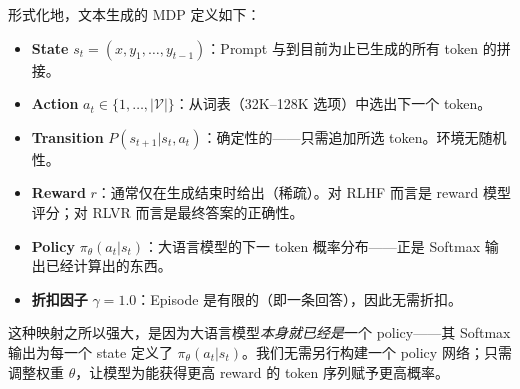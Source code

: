 形式化地，文本生成的 MDP 定义如下：

\begin{itemize}
  \item \textbf{State} $s_t = (x, y_1, \ldots, y_{t-1})$：Prompt 与到目前为止已生成的所有 token 的拼接。
  \item \textbf{Action} $a_t \in \{1, \ldots, |\mathcal{V}|\}$：从词表（32K--128K 选项）中选出下一个 token。
  \item \textbf{Transition} $P(s_{t+1}|s_t, a_t)$：确定性的——只需追加所选 token。环境无随机性。
  \item \textbf{Reward} $r$：通常仅在生成结束时给出（稀疏）。对 RLHF 而言是 reward 模型评分；对 RLVR 而言是最终答案的正确性。
  \item \textbf{Policy} $\pi_\theta(a_t|s_t)$：大语言模型的下一 token 概率分布——正是 Softmax 输出已经计算出的东西。
  \item \textbf{折扣因子} $\gamma = 1.0$：Episode 是有限的（即一条回答），因此无需折扣。
\end{itemize}

这种映射之所以强大，是因为大语言模型\emph{本身就已经是}一个 policy——其 Softmax 输出为每一个 state 定义了 $\pi_\theta(a_t|s_t)$。我们无需另行构建一个 policy 网络；只需调整权重 $\theta$，让模型为能获得更高 reward 的 token 序列赋予更高概率。

